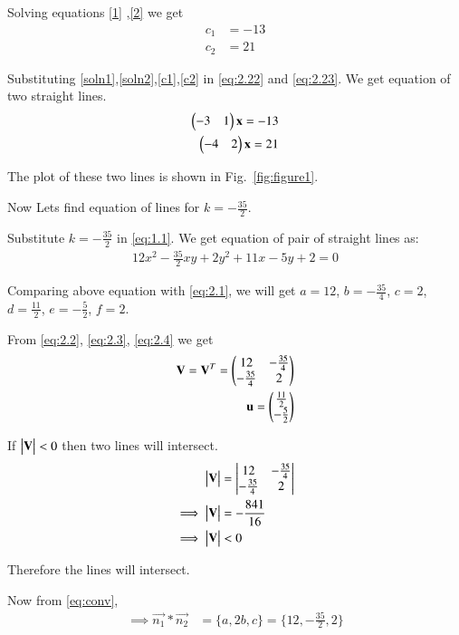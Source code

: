 \documentclass[journal,12pt,twocolumn]{IEEEtran}
\begin{document}
Solving equations \eqref{1} ,\eqref{2} we get 
\begin{align}
    c_1&=-13\label{c1}\\
    c_2&=21\label{c2}
\end{align}

Substituting \eqref{soln1},\eqref{soln2},\eqref{c1},\eqref{c2} in \eqref{eq:2.22} and \eqref{eq:2.23}. We get equation of two straight lines.
\begin{align}
    \begin{pmatrix}-3 & 1\end{pmatrix}\mathbf{x}=-13\\
    \begin{pmatrix}-4 & 2\end{pmatrix}\mathbf{x}=21
\end{align}

The plot of these two lines is shown in Fig.~\ref{fig:figure1}.

Now Lets find equation of lines for $k=-\frac{35}{2}$.

Substitute $k=-\frac{35}{2}$ in \eqref{eq:1.1}. We get equation of pair of straight lines as:
\begin{align}
    12x^2-\frac{35}{2}xy+2y^2+11x-5y+2=0
\end{align}

Comparing above equation with \eqref{eq:2.1}, we will get $a=12$, $b=-\frac{35}{4}$, $c=2$, $d=\frac{11}{2}$, $e=-\frac{5}{2}$, $f=2$.

From \eqref{eq:2.2}, \eqref{eq:2.3}, \eqref{eq:2.4} we get
\begin{align}
    \mathbf{V}=\mathbf{V}^T=\begin{pmatrix}12 & -\frac{35}{4} \\ -\frac{35}{4} & 2\end{pmatrix}\label{eq:2.48}\\
    \mathbf{u}=\begin{pmatrix}\frac{11}{2} \\ -\frac{5}{2}\end{pmatrix}\label{eq:2.49}
\end{align}

If $\begin{vmatrix}\mathbf{V}\end{vmatrix}<0$ then two lines will intersect.
\begin{align}
    \begin{vmatrix}\mathbf{V}\end{vmatrix}&=\begin{vmatrix}12 & -\frac{35}{4} \\ -\frac{35}{4} & 2\end{vmatrix}\\
    \implies\begin{vmatrix}\mathbf{V}\end{vmatrix}&=-\frac{841}{16}\\
    \implies\begin{vmatrix}\mathbf{V}\end{vmatrix}&<0
\end{align}

Therefore the lines will intersect.

Now from \eqref{eq:conv},
\begin{align}
    \implies\vec{n_1}*\vec{n_2}&=\{a,2b,c\}=\{12,-\frac{35}{2},2\}\label{eq:conv2}
\end{align}
\end{document}
